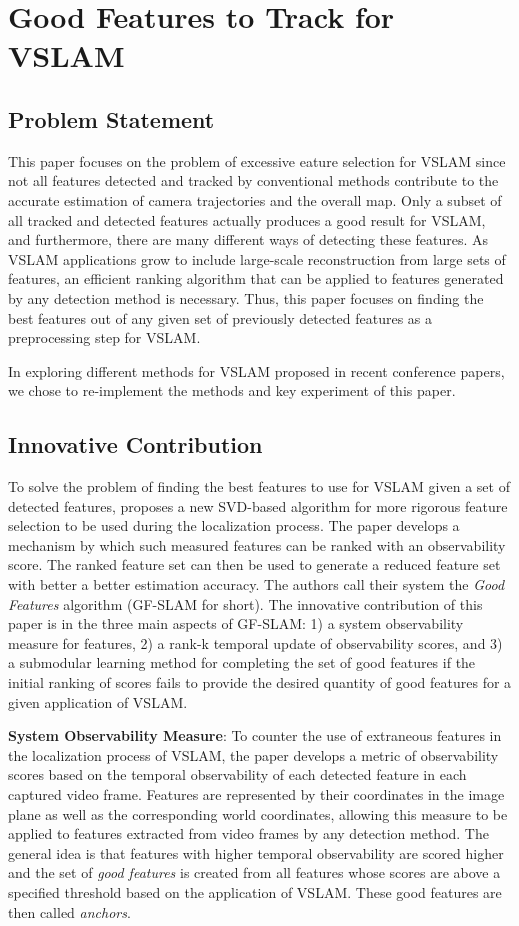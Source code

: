 \documentclass[10pt,twocolumn,letterpaper]{article}
\begin{document}
\section {Good Features to Track for VSLAM}
\subsection{Problem Statement}
This paper focuses on the problem of excessive eature selection for VSLAM since not all features 
detected and tracked by conventional methods contribute to the accurate estimation of 
camera trajectories and the overall map. Only a subset of all tracked and detected features 
actually produces a good result for VSLAM, and furthermore, there are many different ways of
detecting these features. As VSLAM applications grow to include large-scale reconstruction from
 large sets of features, an efficient ranking algorithm that can be applied to features generated by any 
detection method is necessary. Thus, this paper focuses on finding the best features out of any given 
set of previously detected features as a preprocessing step for VSLAM.

In exploring different methods for VSLAM proposed in recent conference papers, 
we chose to re-implement the methods and key experiment of this paper.

\subsection{Innovative Contribution}
To solve the problem of finding the best features to use for VSLAM given a set of detected features, 
\cite{Zhang_2015_CVPR} proposes a new SVD-based algorithm for more rigorous feature selection to be used 
during the localization process. The paper develops a mechanism by which such measured features 
can be ranked with an observability score. The ranked feature set can then be used to generate a 
reduced feature set with better a better estimation accuracy. The authors call their system the \textit{Good 
Features} algorithm (GF-SLAM for short). The innovative contribution of this paper is in the three main 
aspects of GF-SLAM: 1) a system observability measure for features, 2) a rank-k temporal update 
of observability scores, and 3) a submodular learning method for completing the set of good features if 
the initial ranking of scores fails to provide the desired quantity of good features for a given application of 
VSLAM.

\textbf{System Observability Measure}: To counter the use of extraneous features in the localization process 
of VSLAM, the paper develops a metric of observability scores based on the temporal observability 
of each detected feature in each captured video frame. Features are represented by their coordinates in the 
image plane as well as the corresponding world coordinates, allowing this measure to be applied to features 
extracted from video frames by any detection method. The general idea is that features with higher temporal 
observability are scored higher and the set of \textit{good features} is created from all features whose scores are 
above a specified threshold based on the application of VSLAM. These good features are then called 
\textit{anchors}.
\end{document}
